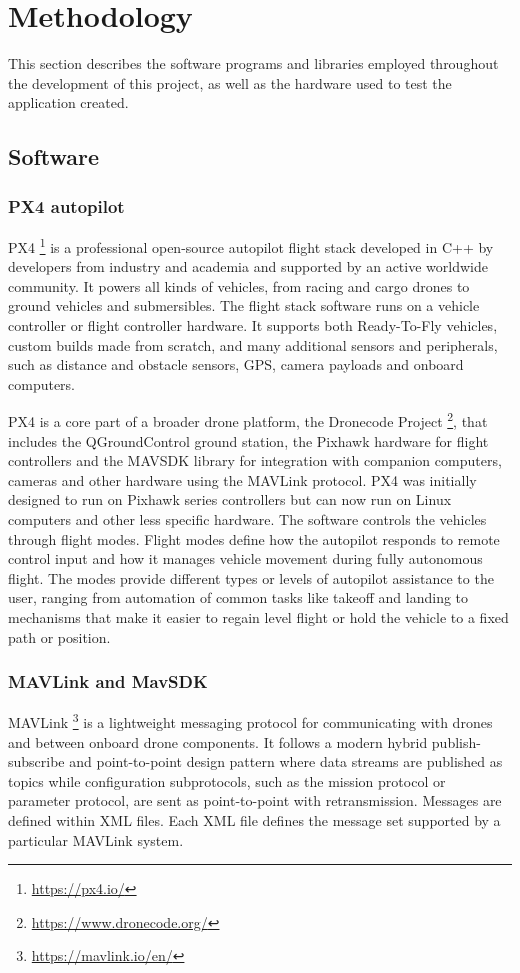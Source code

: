 \section{Methodology}

This section describes the software programs and libraries employed throughout the development of this project, as well as the hardware used to test the application created.

\subsection{Software}

\subsubsection{PX4 autopilot}
\label{subsec:px4}
PX4 \footnote{\url{https://px4.io/}} is a professional open-source autopilot flight stack developed in C++ by developers from industry and academia and supported by an active worldwide community.
It powers all kinds of vehicles, from racing and cargo drones to ground vehicles and submersibles.
The flight stack software runs on a vehicle controller or flight controller hardware.
It supports both Ready-To-Fly vehicles, custom builds made from scratch,
and many additional sensors and peripherals, such as distance and obstacle sensors, GPS, camera payloads and onboard computers.

PX4 is a core part of a broader drone platform, the Dronecode Project \footnote{\url{https://www.dronecode.org/}}, that includes the QGroundControl ground station, the Pixhawk hardware for flight controllers and the MAVSDK library for integration with companion computers, cameras and other hardware using the MAVLink protocol.
PX4 was initially designed to run on Pixhawk series controllers but can now run on Linux computers and other less specific hardware.
The software controls the vehicles through flight modes. 
Flight modes define how the autopilot responds to remote control input and how it manages vehicle movement during fully autonomous flight.
The modes provide different types or levels of autopilot assistance to the user, ranging from automation of common tasks like takeoff and landing 
to mechanisms that make it easier to regain level flight or hold the vehicle to a fixed path or position.

\subsubsection{MAVLink and MavSDK}
\label{subsec:mavlink}
MAVLink \footnote{\url{https://mavlink.io/en/}} is a lightweight messaging protocol for communicating with drones and between onboard drone components.
It follows a modern hybrid publish-subscribe and point-to-point design pattern where data streams are published as topics while configuration subprotocols,
such as the mission protocol or parameter protocol, are sent as point-to-point with retransmission.
Messages are defined within XML files.
Each XML file defines the message set supported by a particular MAVLink system.

